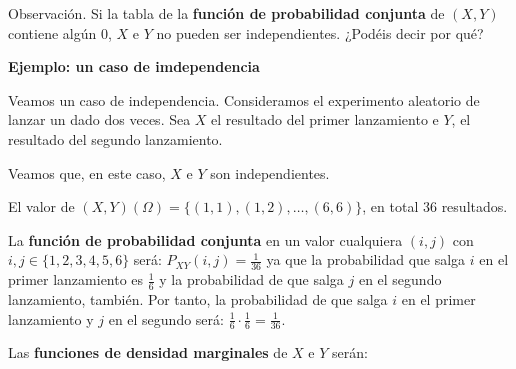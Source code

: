 \documentclass[]{book}
\begin{document}
Observación.
Si la tabla de la \textbf{función de probabilidad conjunta} de \((X,Y)\) contiene algún \(0\), \(X\) e \(Y\) no pueden ser independientes. ¿Podéis decir por qué?

\textbf{Ejemplo: un caso de imdependencia}

Veamos un caso de independencia. Consideramos el experimento aleatorio de lanzar un dado dos veces. Sea \(X\) el resultado del primer lanzamiento e \(Y\), el resultado del segundo lanzamiento.

Veamos que, en este caso, \(X\) e \(Y\) son independientes.

El valor de \((X,Y)(\Omega)=\{(1,1),(1,2),\ldots,(6,6)\}\), en total 36 resultados.

La \textbf{función de probabilidad conjunta} en un valor cualquiera \((i,j)\) con \(i,j\in\{1,2,3,4,5,6\}\) será:
\(P_{XY}(i,j)=\frac{1}{36}\) ya que la probabilidad que salga \(i\) en el primer lanzamiento es \(\frac{1}{6}\) y la probabilidad de que salga \(j\) en el segundo lanzamiento, también. Por tanto, la probabilidad de que salga \(i\) en el primer lanzamiento y \(j\) en el segundo será: \(\frac{1}{6}\cdot \frac{1}{6}=\frac{1}{36}.\)

Las \textbf{funciones de densidad marginales} de \(X\) e \(Y\) serán:
\end{document}
